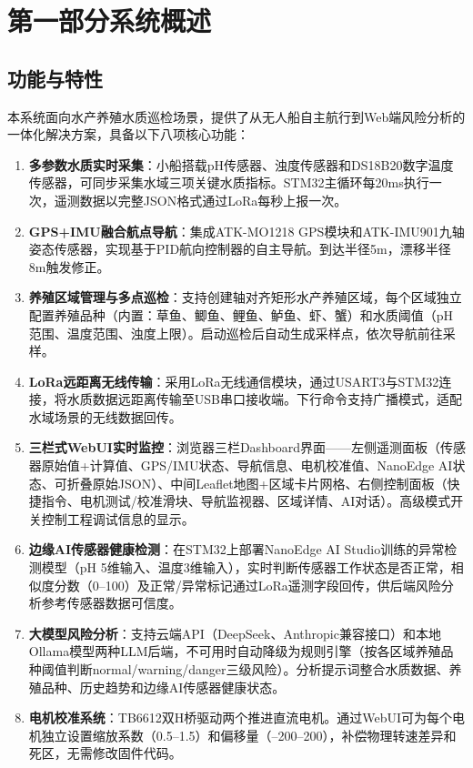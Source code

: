 \documentclass[12pt,a4paper]{ctexart}
\begin{document}
\section{第一部分\quad 系统概述}

\subsection{功能与特性}

本系统面向水产养殖水质巡检场景，提供了从无人船自主航行到Web端风险分析的一体化解决方案，具备以下八项核心功能：

\begin{enumerate}[label=\arabic*.]
    \item \textbf{多参数水质实时采集}：小船搭载pH传感器、浊度传感器和DS18B20数字温度传感器，可同步采集水域三项关键水质指标。STM32主循环每20ms执行一次，遥测数据以完整JSON格式通过LoRa每秒上报一次。

    \item \textbf{GPS+IMU融合航点导航}：集成ATK-MO1218 GPS模块和ATK-IMU901九轴姿态传感器，实现基于PID航向控制器的自主导航。到达半径5m，漂移半径8m触发修正。

    \item \textbf{养殖区域管理与多点巡检}：支持创建轴对齐矩形水产养殖区域，每个区域独立配置养殖品种（内置：草鱼、鲫鱼、鲤鱼、鲈鱼、虾、蟹）和水质阈值（pH范围、温度范围、浊度上限）。启动巡检后自动生成采样点，依次导航前往采样。

    \item \textbf{LoRa远距离无线传输}：采用LoRa无线通信模块，通过USART3与STM32连接，将水质数据远距离传输至USB串口接收端。下行命令支持广播模式，适配水域场景的无线数据回传。

    \item \textbf{三栏式WebUI实时监控}：浏览器三栏Dashboard界面——左侧遥测面板（传感器原始值+计算值、GPS/IMU状态、导航信息、电机校准值、NanoEdge AI状态、可折叠原始JSON）、中间Leaflet地图+区域卡片网格、右侧控制面板（快捷指令、电机测试/校准滑块、导航监视器、区域详情、AI对话）。高级模式开关控制工程调试信息的显示。

    \item \textbf{边缘AI传感器健康检测}：在STM32上部署NanoEdge AI Studio训练的异常检测模型（pH 5维输入、温度3维输入），实时判断传感器工作状态是否正常，相似度分数（0--100）及正常/异常标记通过LoRa遥测字段回传，供后端风险分析参考传感器数据可信度。

    \item \textbf{大模型风险分析}：支持云端API（DeepSeek、Anthropic兼容接口）和本地Ollama模型两种LLM后端，不可用时自动降级为规则引擎（按各区域养殖品种阈值判断normal/warning/danger三级风险）。分析提示词整合水质数据、养殖品种、历史趋势和边缘AI传感器健康状态。

    \item \textbf{电机校准系统}：TB6612双H桥驱动两个推进直流电机。通过WebUI可为每个电机独立设置缩放系数（0.5--1.5）和偏移量（--200--200），补偿物理转速差异和死区，无需修改固件代码。
\end{enumerate}
\end{document}
